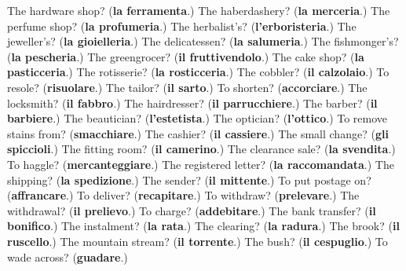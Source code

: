 \begin{tcolorbox}[breakable,colback=teal!4,colframe=teal!35!black,title={Before you move on}]
The hardware shop? (\textbf{la ferramenta}.) The haberdashery? (\textbf{la merceria}.) The perfume shop? (\textbf{la profumeria}.) The herbalist's? (\textbf{l'erboristeria}.) The jeweller's? (\textbf{la gioielleria}.) The delicatessen? (\textbf{la salumeria}.) The fishmonger's? (\textbf{la pescheria}.) The greengrocer? (\textbf{il fruttivendolo}.) The cake shop? (\textbf{la pasticceria}.) The rotisserie? (\textbf{la rosticceria}.) The cobbler? (\textbf{il calzolaio}.) To resole? (\textbf{risuolare}.) The tailor? (\textbf{il sarto}.) To shorten? (\textbf{accorciare}.) The locksmith? (\textbf{il fabbro}.) The hairdresser? (\textbf{il parrucchiere}.) The barber? (\textbf{il barbiere}.) The beautician? (\textbf{l'estetista}.) The optician? (\textbf{l'ottico}.) To remove stains from? (\textbf{smacchiare}.) The cashier? (\textbf{il cassiere}.) The small change? (\textbf{gli spiccioli}.) The fitting room? (\textbf{il camerino}.) The clearance sale? (\textbf{la svendita}.) To haggle? (\textbf{mercanteggiare}.) The registered letter? (\textbf{la raccomandata}.) The shipping? (\textbf{la spedizione}.) The sender? (\textbf{il mittente}.) To put postage on? (\textbf{affrancare}.) To deliver? (\textbf{recapitare}.) To withdraw? (\textbf{prelevare}.) The withdrawal? (\textbf{il prelievo}.) To charge? (\textbf{addebitare}.) The bank transfer? (\textbf{il bonifico}.) The instalment? (\textbf{la rata}.) The clearing? (\textbf{la radura}.) The brook? (\textbf{il ruscello}.) The mountain stream? (\textbf{il torrente}.) The bush? (\textbf{il cespuglio}.) To wade across? (\textbf{guadare}.)
\end{tcolorbox}
